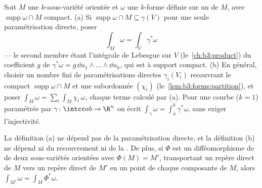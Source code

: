 \begin{definition}\label{def:b3:forms:integral}
Soit $M$ une $k$-sous-variété orientée et $\omega$ une
$k$-forme définie sur un  de $M$, avec
$\operatorname{supp}\omega \cap M$ compact.
(a) Si $\operatorname{supp}\omega \cap M \subseteq
\gamma(V)$ pour une seule paramétrisation directe, poser
\[
\int_M\omega = \int_V\gamma^*\omega
\]
--- le second membre étant l'intégrale de Lebesgue sur $V$
(le~\cref{ch:b3:product}) du coefficient $g$ de
$\gamma^*\omega = g\,\dd u_1\wedge\dots\wedge\dd u_k$, qui
est  à support compact.
(b) En général, choisir un nombre fini de paramétrisations
directes $\gamma_i(V_i)$ recouvrant le compact
$\operatorname{supp}\omega \cap M$ et une
\emph{} subordonnée $(\chi_i)$
(le~\cref{lem:b3:forms:partition}), et poser $\int_M\omega =
\sum_i\int_M\chi_i\,\omega$, chaque terme calculé par (a).
Pour une courbe ($k = 1$) paramétrée par
$\gamma\colon\intcc ab\to\R^n$ on écrit
$\int_\gamma\omega = \int_a^b\gamma^*\omega$, sans exiger
l'injectivité.
\end{definition}

\begin{lemma}[Cohérence]\label{lem:b3:forms:consistency}
La définition (a) ne dépend pas de la paramétrisation
directe, et la définition (b) ne dépend ni du recouvrement ni
de la . De plus, si $\Phi$ est un
difféomorphisme de  de deux sous-variétés orientées
avec $\Phi(M) = M'$, transportant un repère direct de $M$
vers un repère direct de $M'$ en un point de chaque composante
de $M$, alors $\int_{M'}\omega = \int_M\Phi^*\omega$.
\end{lemma}

